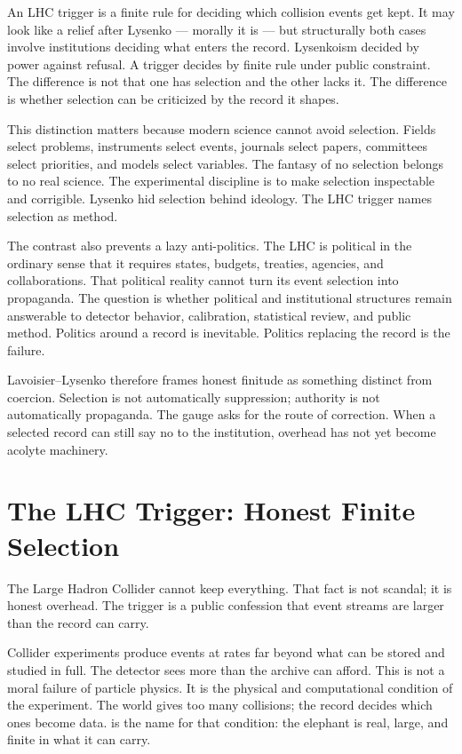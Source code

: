 An LHC trigger is a finite rule for deciding which collision events get
kept. It may look like a relief after Lysenko --- morally it is --- but
structurally both cases involve institutions deciding what enters the
record. Lysenkoism decided by power against refusal. A trigger decides by
finite rule under public constraint. The difference is not that one has
selection and the other lacks it. The difference is whether selection can
be criticized by the record it shapes.

This distinction matters because modern science cannot avoid selection.
Fields select problems, instruments select events, journals select papers,
committees select priorities, and models select variables. The fantasy of
no selection belongs to no real science. The experimental discipline is
to make selection inspectable and corrigible. Lysenko hid selection behind
ideology. The LHC trigger names selection as method.

The contrast also prevents a lazy anti-politics. The LHC is political in
the ordinary sense that it requires states, budgets, treaties, agencies,
and collaborations. That political reality cannot turn its event selection
into propaganda. The question is whether political and institutional
structures remain answerable to detector behavior, calibration,
statistical review, and public method. Politics around a record is
inevitable. Politics replacing the record is the failure.

Lavoisier--Lysenko therefore frames honest finitude as something distinct
from coercion. Selection is not automatically suppression; authority is
not automatically propaganda. The gauge asks for the route of correction.
When a selected record can still say no to the institution, overhead has
not yet become acolyte machinery.

\section{The LHC Trigger: Honest Finite Selection}

The Large Hadron Collider cannot keep everything. That fact is not scandal; it
is honest overhead. The trigger is a public confession that event streams are
larger than the record can carry.

Collider experiments produce events at rates far beyond what can be stored and
studied in full. The detector sees more than the archive can afford. This is
not a moral failure of particle physics. It is the physical and computational
condition of the experiment. The world gives too many collisions; the record
decides which ones become data.  is the name for
that condition: the elephant is real, large, and finite in what it can carry.

